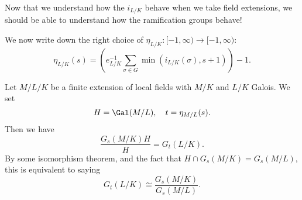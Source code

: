 \documentclass[a4paper]{article}
\begin{document}
Now that we understand how the $i_{L/K}$ behave when we take field extensions, we should be able to understand how the ramification groups behave!

We now write down the right choice of $\eta_{L/K}: [-1, \infty) \to [-1, \infty)$:
\[
  \eta_{L/K}(s) = \left(e_{L/K}^{-1} \sum_{\sigma \in G} \min(i_{L/K}(\sigma), s + 1)\right) - 1.
\]
\begin{thm}
  Let $M/L/K$ be a finite extension of local fields with $M/K$ and $L/K$ Galois. We set
  \[
    H = \Gal(M/L),\quad t = \eta_{M/L}(s).
  \]
  Then we have
  \[
    \frac{G_s(M/K)H}{H} = G_t(L/K).
  \]
  By some isomorphism theorem, and the fact that $H \cap G_s(M/K) = G_s(M/L)$, this is equivalent to saying
  \[
    G_t(L/K) \cong \frac{G_s(M/K)}{G_s(M/L)}.
  \]
\end{thm}
\end{document}
